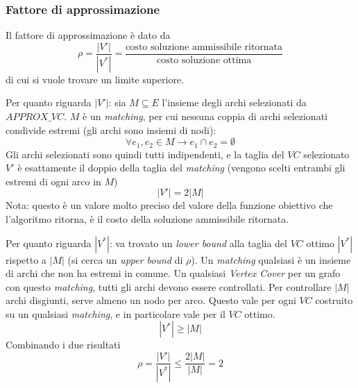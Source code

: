 \subsubsection{Fattore di approssimazione}
Il fattore di approssimazione è dato da
\begin{equation*}
    \rho =
    \frac{
    |V'|
    }{
    |V^*|
    }
    =
    \frac{
        \text{costo soluzione ammissibile ritornata}
    }{
        \text{costo soluzione ottima}
    }
\end{equation*}
di cui si vuole trovare un limite superiore.

Per quanto riguarda $|V'|$:
sia $M \subseteq E$ l'insieme degli archi selezionati da $APPROX\_VC$.
$M$ è un \emph{matching}, per cui nessuna coppia di archi selezionati condivide estremi (gli archi sono insiemi di nodi):
\begin{equation*}
    \forall e_1, e_2 \in M
    \to
    e_1 \cap e_2 = \emptyset
\end{equation*}
Gli archi selezionati sono quindi tutti indipendenti, e la taglia del $VC$ selezionato $V'$ è esattamente il doppio della taglia del \emph{matching}
(vengono scelti entrambi gli estremi di ogni arco in $M$)
\begin{equation*}
    |V'| = 2 |M|
\end{equation*}
Nota: questo è un valore molto preciso del valore della funzione obiettivo che l'algoritmo ritorna, è il costo della soluzione ammissibile ritornata.

Per quanto riguarda $|V^*|$:
va trovato un \emph{lower bound} alla taglia del $VC$ ottimo $
|V^*|
$ rispetto a $|M|$ (si cerca un \emph{upper bound} di $\rho$).
Un \emph{matching} qualsiasi è un insieme di archi che non ha estremi in comune.
Un qualsiasi \emph{Vertex Cover} per un grafo con questo \emph{matching}, tutti gli archi devono essere controllati.
Per controllare $|M|$ archi disgiunti, serve almeno un nodo per arco.
Questo vale per ogni $VC$ costruito su un qualsiasi \emph{matching}, e in particolare vale per il $VC$ ottimo.
\begin{equation*}
    |V^*| \geq |M|
\end{equation*}
Combinando i due risultati
\begin{equation*}
    \rho =
    \frac{
    |V'|
    }{
    |V^*|
    }
    \leq
    \frac{
    2|M|
    }{
    |M|
    }
    = 2
\end{equation*}

